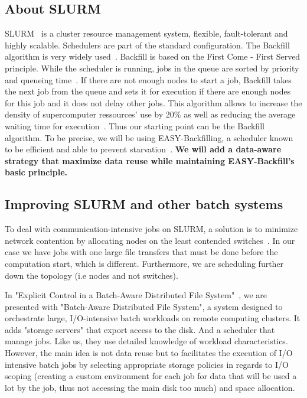 \documentclass[a4paper]{article}
\begin{document}
\subsection{About SLURM}
SLURM~\cite{SLURM} is a cluster resource management system, flexible, fault-tolerant and highly scalable.
Schedulers are part of the standard configuration. The Backfill algorithm is very widely used~\cite{New_Backfill}.
Backfill is based on the First Come - First Served principle. While the scheduler is running, jobs in the queue are sorted by priority and queueing time~\cite{New_Backfill}.
If there are not enough nodes to start a job, Backfill takes the next job from the queue and sets it for execution if there are enough nodes for this job and 
it does not delay other jobs.
This algorithm allows to increase the density of supercomputer ressources' use by 20\% as well as reducing the average waiting time
for execution~\cite{Maui_Scheduler}.
Thus our starting point can be the Backfill algorithm.
To be precise, we will be using EASY-Backfilling, a scheduler known to be efficient and able to prevent starvation~\cite{easybf}.
\textbf{We will add a data-aware strategy that maximize data reuse while maintaining EASY-Backfill's basic principle.}

\subsection{Improving SLURM and other batch systems}
To deal with communication-intensive jobs on SLURM, a solution is to minimize network contention by allocating nodes on the least
contended switches~\cite{minimize_network_contention}. In our case we have
jobs with one large file transfers that must be done before the computation start, which is different.
Furthermore, we are scheduling further down the topology (i.e nodes and not switches).

In "Explicit Control in a Batch-Aware Distributed File System"~\cite{Explicit_Control_in_a_Batch-Aware_Distributed_File_System},
we are presented with "Batch-Aware Distributed File System", a system designed to orchestrate large, 
I/O-intensive batch workloads on remote computing clusters.
It adds "storage servers" that export access to the disk. And a scheduler that
manage jobs. 
Like us, they use detailed knowledge of workload characteristics.
However, the main idea is not data reuse but to
facilitates the execution of I/O intensive batch
jobs by selecting appropriate storage policies
in regards to I/O scoping (creating a custom environment for each job
for data that will be used a lot by the job, thus not accessing the main disk too
much) and space allocation.
\end{document}
